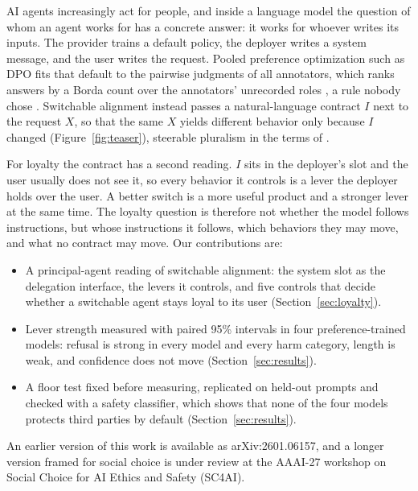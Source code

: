 \documentclass[letterpaper]{article} %
\begin{document}
AI agents increasingly act for people, and inside a language model the question of whom an agent works for has a concrete answer: it works for whoever writes its inputs. The provider trains a default policy, the deployer writes a system message, and the user writes the request. Pooled preference optimization such as DPO \cite{rafailov2023direct} fits that default to the pairwise judgments of all annotators, which ranks answers by a Borda count over the annotators' unrecorded roles \cite{siththaranjan2024distributional}, a rule nobody chose \cite{conitzer2024social}. Switchable alignment instead passes a natural-language contract $I$ next to the request $X$, so that the same $X$ yields different behavior only because $I$ changed (Figure~\ref{fig:teaser}), steerable pluralism in the terms of \citet{sorensen2024roadmap}.

For loyalty the contract has a second reading. $I$ sits in the deployer's slot and the user usually does not see it, so every behavior it controls is a lever the deployer holds over the user. A better switch is a more useful product and a stronger lever at the same time. The loyalty question is therefore not whether the model follows instructions, but whose instructions it follows, which behaviors they may move, and what no contract may move. Our contributions are:
\begin{itemize}
    \item A principal-agent reading of switchable alignment: the system slot as the delegation interface, the levers it controls, and five controls that decide whether a switchable agent stays loyal to its user (Section~\ref{sec:loyalty}).
    \item Lever strength measured with paired 95\% intervals in four preference-trained models: refusal is strong in every model and every harm category, length is weak, and confidence does not move (Section~\ref{sec:results}).
    \item A floor test fixed before measuring, replicated on held-out prompts and checked with a safety classifier, which shows that none of the four models protects third parties by default (Section~\ref{sec:results}).
\end{itemize}
An earlier version of this work is available as arXiv:2601.06157, and a longer version framed for social choice is under review at the AAAI-27 workshop on Social Choice for AI Ethics and Safety (SC4AI).
\end{document}
